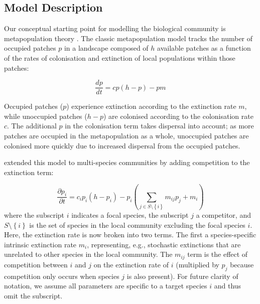\subsection{Model Description}

Our conceptual starting point for modelling the biological community is metapopulation theory \autocite{Levins1969}.
The classic metapopulation model tracks the number of occupied patches $p$ in a landscape composed of $h$ available patches as a function of the rates of colonisation and extinction of local populations within those patches:

\begin{equation}
	\frac{dp}{dt} = cp \left( h - p \right) - pm \label{eq:levins}
\end{equation}

Occupied patches ($p$) experience extinction according to the extinction rate $m$, while unoccupied patches ($h-p$) are colonised according to the colonisation rate $c$. 
The additional $p$ in the colonisation term takes dispersal into account; as more patches are occupied in the metapopulation as a whole, unoccupied patches are colonised more quickly due to increased dispersal from the occupied patches.

\textcite{Hunt2009} extended this model to multi-species communities by adding competition to the extinction term:

\begin{equation}
	\frac{\partial p_i}{\partial t} = c_i p_i \left( h-p_i \right) - p_i \left( \sum_{j \in S \setminus \left\{i \right\} }{m_{ij}p_j} + m_i \right) \label{eq:hunt}
\end{equation}
where the subscript $i$ indicates a focal species, the subscript $j$ a competitor, and $S \setminus \left\{i \right\}$ is the set of species in the local community excluding the focal species $i$.
Here, the extinction rate is now broken into two terms.
The first a species-specific intrinsic extinction rate $m_i$, representing, e.g., stochastic extinctions that are unrelated to other species in the local community.
The $m_{ij}$ term is the effect of competition between $i$ and $j$ on the extinction rate of $i$ (multiplied by $p_j$ because competition only occurs when species $j$ is also present).
For future clarity of notation, we assume all parameters are specific to a target species $i$ and thus omit the subscript.

